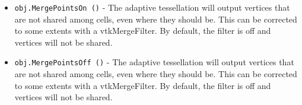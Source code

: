 \begin{itemize}
\item  \verb|obj.MergePointsOn ()| -  The adaptive tessellation will output vertices that are not shared
 among cells, even where they should be. This can be corrected to
 some extents with a vtkMergeFilter.
 By default, the filter is off and vertices will not be shared.

\item  \verb|obj.MergePointsOff ()| -  The adaptive tessellation will output vertices that are not shared
 among cells, even where they should be. This can be corrected to
 some extents with a vtkMergeFilter.
 By default, the filter is off and vertices will not be shared.

\end{itemize}
